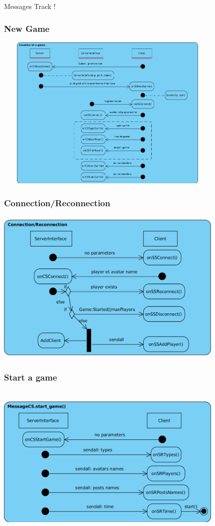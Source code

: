 \documentclass[9pt]{beamer}
\begin{document}
\begin{frame}
	\begin{Huge}
		Messages Track !
	\end{Huge}
\end{frame}


\begin{frame}
	\frametitle{New Game}
 	\centerline{ \includegraphics[width=11cm, height=7.5cm]{images/gamecreation.png}}
	\transdissolve
\end{frame}

\begin{frame}
	\frametitle{Connection/Reconnection}
 	\centerline{ \includegraphics[width=11cm, height=7.5cm]{images/connectionreconnection.png}}
	\transdissolve
\end{frame}

\begin{frame}
	\frametitle{Start a game}
 	\centerline{ \includegraphics[width=11cm, height=7.5cm]{images/ongamestart.png}}
	\transdissolve
\end{frame}
\end{document}
